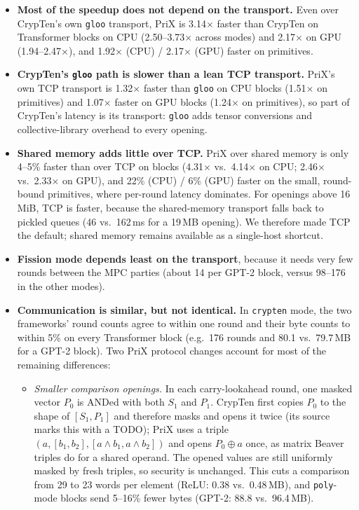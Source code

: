 \documentclass[11pt]{article}
\begin{document}
\begin{itemize}
    \item \textbf{Most of the speedup does not depend on the transport.} Even over CrypTen's own \texttt{gloo} transport, PriX is 3.14$\times$ faster than CrypTen on Transformer blocks on CPU (2.50--3.73$\times$ across modes) and 2.17$\times$ on GPU (1.94--2.47$\times$), and 1.92$\times$ (CPU) / 2.17$\times$ (GPU) faster on primitives.
    \item \textbf{CrypTen's \texttt{gloo} path is slower than a lean TCP transport.} PriX's own TCP transport is 1.32$\times$ faster than \texttt{gloo} on CPU blocks (1.51$\times$ on primitives) and 1.07$\times$ faster on GPU blocks (1.24$\times$ on primitives), so part of CrypTen's latency is its transport: \texttt{gloo} adds tensor conversions and collective-library overhead to every opening.
    \item \textbf{Shared memory adds little over TCP.} PriX over shared memory is only 4--5\% faster than over TCP on blocks (4.31$\times$ vs.\ 4.14$\times$ on CPU; 2.46$\times$ vs.\ 2.33$\times$ on GPU), and 22\% (CPU) / 6\% (GPU) faster on the small, round-bound primitives, where per-round latency dominates. For openings above 16\,MiB, TCP is faster, because the shared-memory transport falls back to pickled queues (46 vs.\ 162\,ms for a 19\,MB opening). We therefore made TCP the default; shared memory remains available as a single-host shortcut.
    \item \textbf{Fission mode depends least on the transport}, because it needs very few rounds between the MPC parties (about 14 per GPT-2 block, versus 98--176 in the other modes).
    \item \textbf{Communication is similar, but not identical.} In \texttt{crypten} mode, the two frameworks' round counts agree to within one round and their byte counts to within 5\% on every Transformer block (e.g.\ 176 rounds and 80.1 vs.\ 79.7\,MB for a GPT-2 block). Two PriX protocol changes account for most of the remaining differences:
    \begin{itemize}
        \item \emph{Smaller comparison openings.} In each carry-lookahead round, one masked vector $P_0$ is ANDed with both $S_1$ and $P_1$. CrypTen first copies $P_0$ to the shape of $[S_1, P_1]$ and therefore masks and opens it twice (its source marks this with a TODO); PriX uses a triple $(a, [b_1, b_2], [a \wedge b_1, a \wedge b_2])$ and opens $P_0 \oplus a$ once, as matrix Beaver triples do for a shared operand. The opened values are still uniformly masked by fresh triples, so security is unchanged. This cuts a comparison from 29 to 23 words per element (ReLU: 0.38 vs.\ 0.48\,MB), and \texttt{poly}-mode blocks send 5--16\% fewer bytes (GPT-2: 88.8 vs.\ 96.4\,MB).

\end{itemize}
\end{itemize}
\end{document}
